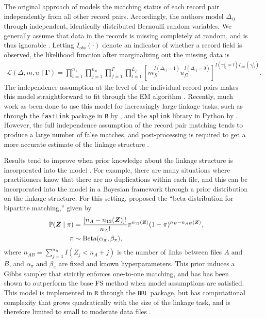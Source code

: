 \documentclass[12pt,letterpaper]{article}
\newcommand{\1}[1]{\mathbb{I}\!\left[#1\right]} %
\begin{document}
The original approach of \cite{fellegi_theory_1969} models the matching status of each record pair independently from all other record pairs. Accordingly, the authors model $\Delta_{ij}$ through independent, identically distributed Bernoulli random variables. We generally assume that data in the records is missing completely at random, and is thus ignorable \citep{little_statistical_2002}. Letting $I_{obs}(\cdot)$ denote an indicator of whether a record field is observed, the likelihood function after marginalizing out the missing data is
\begin{align}
	\label{eqn:likelihood}
	\mathcal{L}(\Delta, m,u\mid\bm{\Gamma})=\prod_{i=1}^{n_A}\prod_{j=1}^{n_B}\prod_{f=1}^F\prod_{l=1}^{L_f}\left[m_{fl}^{I(\Delta_{ij} = 1)}u_{fl}^{I(\Delta_{ij} =0)}\right] ^{I(\gamma_{ij}^{f} = l) I_{obs}(\gamma_{ij}^f)}.
\end{align}
The independence assumption at the level of the individual record pairs makes this model straightforward to fit through the EM algorithm \citep{sariyar_2010}. Recently, much work as been done to use this model for increasingly large linkage tasks, such as through the
\texttt{fastLink} package in \texttt{R} by \cite{enamorado_using_2019}, and the \texttt{splink} library in Python by \cite{Linacre_Lindsay_Manassis_Slade_Hepworth_2022}. However, the full independence assumption of the record pair matching tends to produce a large number of false matches, and post-processing is required to get a more accurate estimate of the linkage structure \cite{jaro_1989}.
 
Results tend to improve when prior knowledge about the linkage structure is incorporated into the model \cite{sadinle_bayesian_2017}. For example, there are many situations where practitioners know that there are no duplications within each file, and this can be incorporated into the model in a Bayesian framework through a prior distribution on the linkage structure. For this setting, \cite{sadinle_bayesian_2017} proposed the ``beta distribution for bipartite matching,'' given by
\begin{align}
	\label{eqn:brlprior}
	\mathbb{P}(\bm{Z}\mid \pi) &=\dfrac{[n_A-n_{12}(\bm{Z})]!}{n_A!} %
	\pi^{n_{12}(\bm{Z})}(1-\pi)^{n_B-n_{AB}(\bm{Z})},  	\\
	\pi &\sim \text{Beta}(\alpha_{\pi}, \beta_{\pi}), \notag
\end{align}
where $n_{AB} = \sum_{j=1}^{n_B} I(Z_j < n_A + j)$ is the number of links between files $A$ and $B$, and $\alpha_{\pi}$ and $\beta_{\pi}$ are fixed and known hyperparameters. This prior induces a Gibbs sampler that strictly enforces one-to-one matching, and has has been shown to outperform the base FS method when model assumptions are satisfied. This model is implemented in \texttt{R} through the \texttt{BRL} package, but has computational complexity that grows quadratically with the size of the linkage task, and is therefore limited to small to moderate data files \citep{BRL}.
\end{document}

